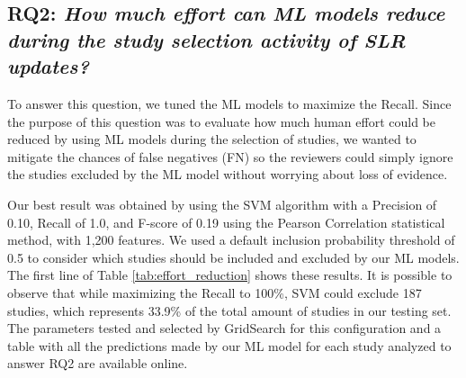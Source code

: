 \subsection{RQ2: \textit{How much effort can ML models reduce during the study selection activity of SLR updates?}}
\label{results:RQ2}




To answer this question, we tuned the ML models to maximize the Recall. Since the purpose of this question was to evaluate how much human effort could be reduced by using ML models during the selection of studies, we wanted to mitigate the chances of false negatives (FN) so the reviewers could simply ignore the studies excluded by the ML model without worrying about loss of evidence.

Our best result was obtained by using the SVM algorithm with a Precision of 0.10, Recall of 1.0, and F-score of 0.19 using the Pearson Correlation statistical method, with 1,200 features. We used a default inclusion probability threshold of 0.5 to consider which studies should be included and excluded by our ML models. The first line of Table \ref{tab:effort_reduction} shows these results. It is possible to observe that while maximizing the Recall to 100\%, SVM could exclude 187 studies, which represents 33.9\% of the total amount of studies in our testing set. The parameters tested and selected by GridSearch for this configuration and a table with all the predictions made by our ML model for each study analyzed to answer RQ2 are available online.  

